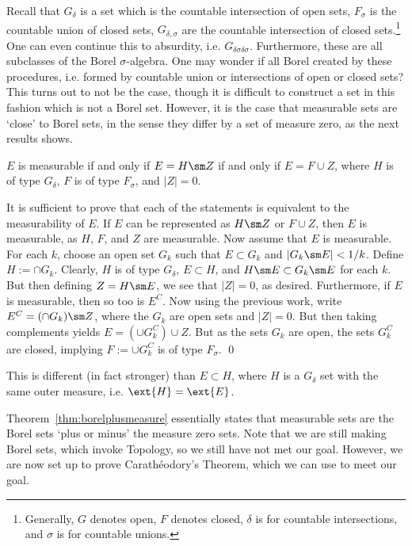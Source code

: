  Recall that $G_\delta$ is a set which is the countable intersection of open sets, $F_\sigma$ is the countable union of closed sets, $G_{\delta,\sigma}$ are the countable intersection of closed sets.\footnote{Generally, $G$ denotes open, $F$ denotes closed, $\delta$ is for countable intersections, and $\sigma$ is for countable unions.} One can even continue this to absurdity, i.e. $G_{\delta\sigma\delta\sigma}$. Furthermore, these are all subclasses of the Borel $\sigma$-algebra. One may wonder if all Borel created by these procedures, i.e. formed by countable union or intersections of open or closed sets? This turns out to not be the case, though it is difficult to construct a set in this fashion which is not a Borel set. However, it is the case that measurable sets are `close' to Borel sets, in the sense they differ by a set of measure zero, as the next results shows.
 
 
 \begin{thm} \label{thm:borelplusmeasure}
 $E$ is measurable if and only if $E= H \sm Z$ if and only if $E= F \cup Z$, where $H$ is of type $G_\delta$, $F$ is of type $F_\sigma$, and $|Z|=0$.
 \end{thm}

\pf It is sufficient to prove that each of the statements is equivalent to the measurability of $E$. If $E$ can be represented as $H \sm Z$ or $F \cup Z$, then $E$ is measurable, as $H$, $F$, and $Z$ are measurable. Now assume that $E$ is measurable. For each $k$, choose an open set $G_k$ such that $E \subset G_k$ and $|G_k \sm E|<1/k$. Define $H:= \cap G_k$. Clearly, $H$ is of type $G_\delta$, $E \subset H$, and $H \sm E \subset G_k \sm E$ for each $k$. But then defining $Z= H \sm E$, we see that $|Z|=0$, as desired. Furthermore, if $E$ is measurable, then so too is $E^C$. Now using the previous work, write $E^C= (\cap G_k ) \sm Z$, where the $G_k$ are open sets and $|Z|=0$. But then taking complements yields $E= (\cup G_k^C) \cup Z$. But as the sets $G_k$ are open, the sets $G_k^C$ are closed, implying $F:=\cup G_k^C$ is of type $F_\sigma$. \qed \\


\begin{rem}
This is different (in fact stronger) than $E \subset H$, where $H$ is a $G_\delta$ set with the same outer measure, i.e. $\ext{H}=\ext{E}$. 
\end{rem}


\noindent Theorem~\ref{thm:borelplusmeasure} essentially states that measurable sets are the Borel sets `plus or minus' the measure zero sets. Note that we are still making Borel sets, which invoke Topology, so we still have not met our goal. However, we are now set up to prove Carath\'eodory's Theorem, which we can use to meet our goal. 


